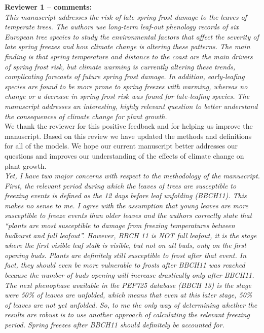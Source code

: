 \documentclass[11pt,a4paper]{article}\usepackage[]{graphicx}\usepackage[]{color}
\begin{document}
\textbf {Reviewer 1 -- comments:} \\

\textit{This manuscript addresses the risk of late spring frost damage to the leaves of temperate trees. The authors use long-term leaf-out phenology records of six European tree species to study the environmental factors that affect the severity of late spring freezes and how climate change is altering these patterns. The main finding is that spring temperature and distance to the coast are the main drivers of spring frost risk, but climate warming is currently altering these trends, complicating forecasts of future spring frost damage. In addition, early-leafing species are found to be more prone to spring freezes with warming, whereas no change or a decrease in spring frost risk was found for late-leafing species. The manuscript addresses an interesting, highly relevant question to better understand the consequences of climate change for plant growth.}\\

We thank the reviewer for this positive feedback and for helping us improve the manuscript. Based on this review we have updated the methods and definitions for all of the models. We hope our current manuscript better addresses our questions and improves our understanding of the effects of climate change on plant growth.\\

\textit{Yet, I have two major concerns with respect to the methodology of the manuscript.
First, the relevant period during which the leaves of trees are susceptible to freezing events is defined as the 12 days before leaf unfolding (BBCH11). This makes no sense to me. I agree with the assumption that young leaves are more susceptible to freeze events than older leaves and the authors correctly state that ``plants are most susceptible to
damage from freezing temperatures between budburst and full leafout''. However, BBCH 11 is NOT full leafout, it is the stage where the first visible leaf stalk is visible, but not on all buds, only on the first opening buds. Plants are definitely still susceptible to frost after that event. In fact, they should even be more vulnerable to frosts after BBCH11 was reached because the number of buds opening will increase drastically only after BBCH11. The next phenophase available in the PEP725 database (BBCH 13) is the stage were 50\% of leaves are unfolded, which means that even at this later stage, 50\% of leaves are not yet unfolded. So, to me the only way of determining whether the results are robust is to use another approach of calculating the relevant freezing period. Spring freezes after BBCH11 should definitely be accounted for.} \\
\end{document}
